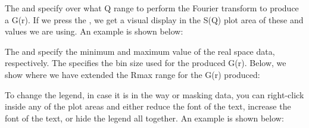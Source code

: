 The  and  specify over what Q range to perform the Fourier transform to produce a G(r). If we press the , we get a visual display in the S(Q) plot area of these  and  values we are using. An example is shown below:

\noindent{}

The  and  specify the minimum and maximum value of the real space data, respectively. The  specifies the bin size used for the produced G(r). Below, we show where we have extended the Rmax range for the G(r) produced:

\noindent{}

To change the legend, in case it is in the way or masking data, you can right-click inside any of the plot areas and either reduce the font of the text, increase the font of the text, or hide the legend all together. An example is shown below:

